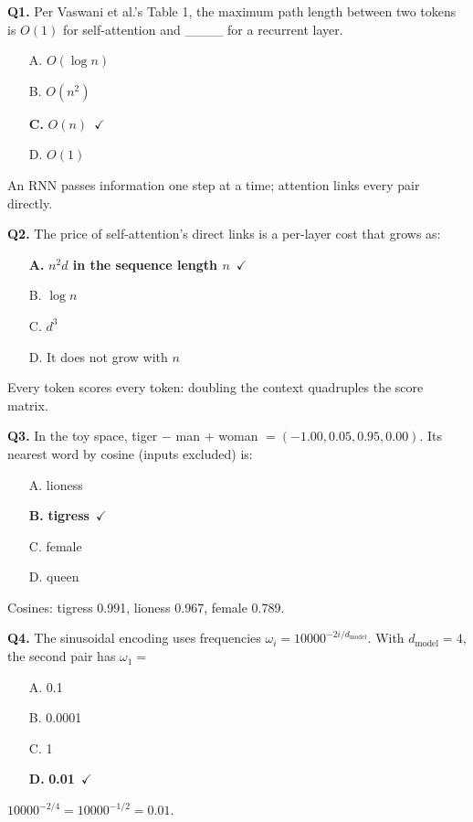 \documentclass[11pt]{article}
\begin{document}
{\small

\noindent\textbf{Q1.} Per Vaswani et al.'s Table 1, the maximum path length between two tokens is $O(1)$ for self-attention and \_\_\_\_ for a recurrent layer.\begin{itemize}[leftmargin=2.2em,itemsep=0pt,topsep=1pt]\item[A.] $O(\log n)$\item[B.] $O(n^2)$\item[\textbf{C.}] \textbf{$O(n)$}~{\color{GrnN}$\checkmark$}\item[D.] $O(1)$\end{itemize} An RNN passes information one step at a time; attention links every pair directly.\par\medskip

\noindent\textbf{Q2.} The price of self-attention's direct links is a per-layer cost that grows as:\begin{itemize}[leftmargin=2.2em,itemsep=0pt,topsep=1pt]\item[\textbf{A.}] \textbf{$n^2d$ in the sequence length $n$}~{\color{GrnN}$\checkmark$}\item[B.] $\log n$\item[C.] $d^3$\item[D.] It does not grow with $n$\end{itemize} Every token scores every token: doubling the context quadruples the score matrix.\par\medskip

\noindent\textbf{Q3.} In the toy space, tiger $-$ man $+$ woman $=(-1.00,0.05,0.95,0.00)$. Its nearest word by cosine (inputs excluded) is:\begin{itemize}[leftmargin=2.2em,itemsep=0pt,topsep=1pt]\item[A.] lioness\item[\textbf{B.}] \textbf{tigress}~{\color{GrnN}$\checkmark$}\item[C.] female\item[D.] queen\end{itemize} Cosines: tigress 0.991, lioness 0.967, female 0.789.\par\medskip

\noindent\textbf{Q4.} The sinusoidal encoding uses frequencies $\omega_i=10000^{-2i/d_{\text{model}}}$. With $d_{\text{model}}=4$, the second pair has $\omega_1=$\begin{itemize}[leftmargin=2.2em,itemsep=0pt,topsep=1pt]\item[A.] 0.1\item[B.] 0.0001\item[C.] 1\item[\textbf{D.}] \textbf{0.01}~{\color{GrnN}$\checkmark$}\end{itemize} $10000^{-2/4}=10000^{-1/2}=0.01$.\par\medskip

}
\end{document}
